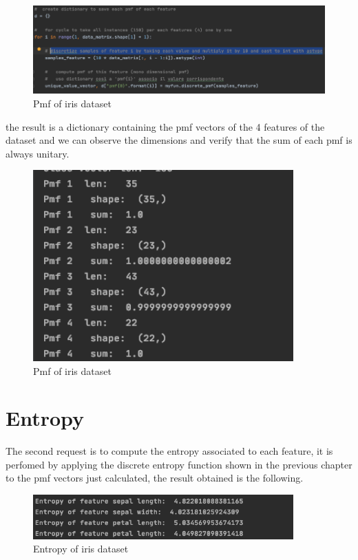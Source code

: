 \documentclass[12pt]{report}
\begin{document}
\begin{figure}[h!]
    \centering
    \includegraphics[width=15cm]{Pictures/Discretized iris.png}
    \caption{Pmf of iris dataset}
\end{figure}

the result is a dictionary containing the pmf vectors of the 4 features of the dataset and we can observe the dimensions and verify that the sum of each pmf is always unitary.

\begin{figure}[h!]
    \centering
    \includegraphics[width=10cm]{Pictures/Pmfs iris.png}
    \caption{Pmf of iris dataset}
\end{figure}



\section{Entropy}
The second request is to compute the entropy associated to each feature, it is perfomed by applying the discrete entropy function shown in the previous chapter to the pmf vectors just calculated, the result obtained is the following.

\begin{figure}[h!]
    \centering
    \includegraphics[width=10cm]{Pictures/Entropy iris.png}
    \caption{Entropy of iris dataset}
\end{figure}
\end{document}
